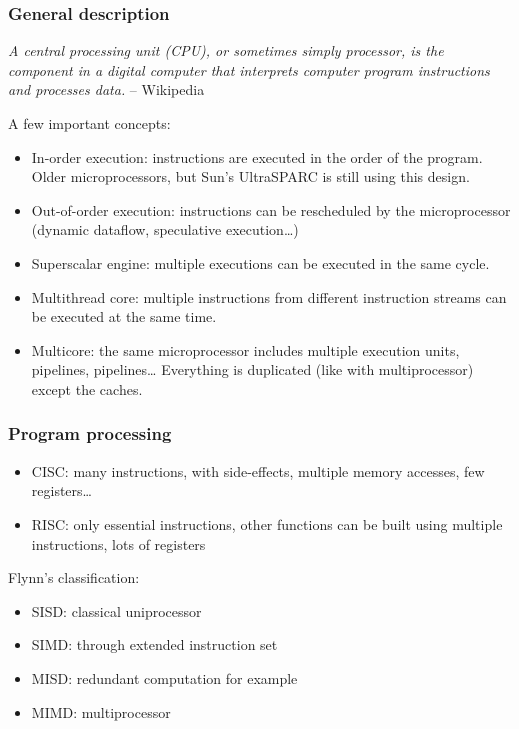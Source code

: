 \begin{frame}
  \frametitle{General description}

  \emph{A central processing unit (CPU), or sometimes simply
  processor, is the component in a digital computer that interprets
  computer program instructions and processes data.} -- Wikipedia

  \-

  A few important concepts:

  \begin{itemize}
  \item
    In-order execution: instructions are executed in the order of the
    program. Older microprocessors, but Sun's UltraSPARC is still
    using this design.
  \item
    Out-of-order execution: instructions can be rescheduled by the
    microprocessor (dynamic dataflow, speculative execution\ldots)
  \item
    Superscalar engine: multiple executions can be executed in the same cycle.
  \item
    Multithread core: multiple instructions from different instruction
    streams can be executed at the same time.
  \item
    Multicore: the same microprocessor includes multiple execution
    units, pipelines, pipelines\ldots{} Everything is duplicated (like
    with multiprocessor) except the caches.
  \end{itemize}

\end{frame}


\begin{frame}
  \frametitle{Program processing}

  \begin{itemize}
  \item
    CISC: many instructions, with side-effects, multiple memory
    accesses, few registers\ldots
  \item
    RISC: only essential instructions, other functions can be built
    using multiple instructions, lots of registers
  \end{itemize}

  \-

  Flynn's classification:

  \begin{itemize}
  \item
    SISD: classical uniprocessor
  \item
    SIMD: through extended instruction set
  \item
    MISD: redundant computation for example
  \item
    MIMD: multiprocessor
  \end{itemize}

\end{frame}

